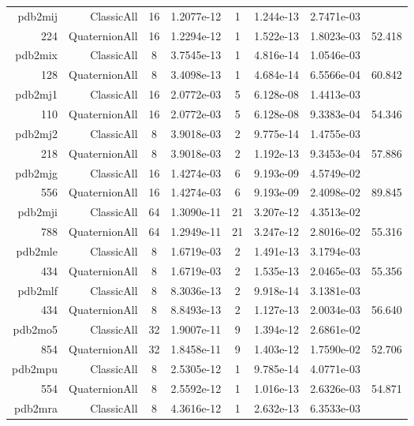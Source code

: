 \begin{xltabular}{\textwidth}{r|rcS[table-format=1.4e+2]cS[table-format=1.3e+2]S[table-format=1.4e+2]S[table-format=-1.3]}
pdb2mij & ClassicAll & 16 & 1.2077e-12 & 1 & 1.244e-13 & 2.7471e-03 & \\
224 & QuaternionAll & 16 & 1.2294e-12 & 1 & 1.522e-13 & 1.8023e-03 & 52.418\\  \addlinespace
pdb2mix & ClassicAll & 8 & 3.7545e-13 & 1 & 4.816e-14 & 1.0546e-03 & \\
128 & QuaternionAll & 8 & 3.4098e-13 & 1 & 4.684e-14 & 6.5566e-04 & 60.842\\  \addlinespace
pdb2mj1 & ClassicAll & 16 & 2.0772e-03 & 5 & 6.128e-08 & 1.4413e-03 & \\
110 & QuaternionAll & 16 & 2.0772e-03 & 5 & 6.128e-08 & 9.3383e-04 & 54.346\\  \addlinespace
pdb2mj2 & ClassicAll & 8 & 3.9018e-03 & 2 & 9.775e-14 & 1.4755e-03 & \\
218 & QuaternionAll & 8 & 3.9018e-03 & 2 & 1.192e-13 & 9.3453e-04 & 57.886\\  \addlinespace
pdb2mjg & ClassicAll & 16 & 1.4274e-03 & 6 & 9.193e-09 & 4.5749e-02 & \\
556 & QuaternionAll & 16 & 1.4274e-03 & 6 & 9.193e-09 & 2.4098e-02 & 89.845\\  \addlinespace
pdb2mji & ClassicAll & 64 & 1.3090e-11 & 21 & 3.207e-12 & 4.3513e-02 & \\
788 & QuaternionAll & 64 & 1.2949e-11 & 21 & 3.247e-12 & 2.8016e-02 & 55.316\\  \addlinespace
pdb2mle & ClassicAll & 8 & 1.6719e-03 & 2 & 1.491e-13 & 3.1794e-03 & \\
434 & QuaternionAll & 8 & 1.6719e-03 & 2 & 1.535e-13 & 2.0465e-03 & 55.356\\  \addlinespace
pdb2mlf & ClassicAll & 8 & 8.3036e-13 & 2 & 9.918e-14 & 3.1381e-03 & \\
434 & QuaternionAll & 8 & 8.8493e-13 & 2 & 1.127e-13 & 2.0034e-03 & 56.640\\  \addlinespace
pdb2mo5 & ClassicAll & 32 & 1.9007e-11 & 9 & 1.394e-12 & 2.6861e-02 & \\
854 & QuaternionAll & 32 & 1.8458e-11 & 9 & 1.403e-12 & 1.7590e-02 & 52.706\\  \addlinespace
pdb2mpu & ClassicAll & 8 & 2.5305e-12 & 1 & 9.785e-14 & 4.0771e-03 & \\
554 & QuaternionAll & 8 & 2.5592e-12 & 1 & 1.016e-13 & 2.6326e-03 & 54.871\\  \addlinespace
pdb2mra & ClassicAll & 8 & 4.3616e-12 & 1 & 2.632e-13 & 6.3533e-03 & \\

\end{xltabular}
